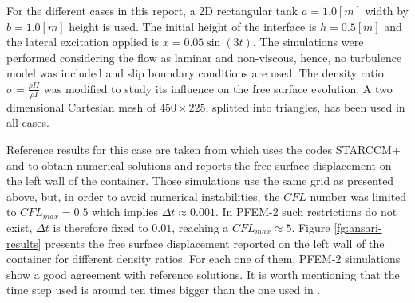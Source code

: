 For the different cases in this report, a 2D rectangular tank $a=1.0[m]$ width by $b=1.0[m]$ height is used. The initial height of the interface is $h=0.5[m]$ and the lateral excitation applied is $x=0.05\sin(3t)$. The simulations were performed considering the flow as laminar and non-viscous, hence, no turbulence model was included and slip boundary conditions are used. The density ratio $\sigma=\frac{\rho{II}}{\rho{I}}$ was modified to study its influence on the free surface evolution. A two dimensional Cartesian mesh of $450\times225$, splitted into triangles, has been used in all cases.

Reference results for this case are taken from \cite{Goni13} which uses the codes STARCCM+ and \OF to obtain numerical solutions and reports the free surface displacement on the left wall of the container. Those simulations use the same grid as presented above, but, in order to avoid numerical instabilities, the $CFL$ number was limited to $CFL_{max}=0.5$ which implies $\Delta t \approx 0.001$. In PFEM-2 such restrictions do not exist, $\Delta t$ is therefore fixed to $0.01$, reaching a $CFL_{max}\approx5$.
Figure \ref{fg:ansari-results} presents the free surface displacement reported on the left wall of the container for different density ratios. For each one of them, PFEM-2 simulations show a good agreement with reference solutions. It is worth mentioning that the time step used is around ten times bigger than the one used in \cite{Goni13}.


